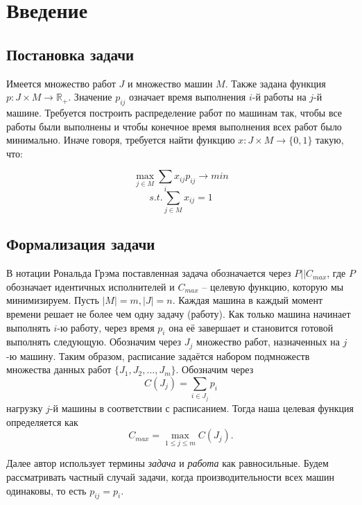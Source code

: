 \section{Введение}

\subsection{Постановка задачи}
Имеется множество работ $J$ и множество машин $M$. Также задана функция $p : J \times M \rightarrow \mathbb{R}_{+}$. Значение $p_{ij}$ означает время выполнения $i$-й работы на $j$-й машине. Требуется построить распределение работ по машинам так, чтобы все работы были выполнены и чтобы конечное время выполнения всех работ было минимально. Иначе говоря, требуется найти функцию $x : J \times M \rightarrow \{0, 1\}$ такую, что:

$$\max_{j \in M} \sum_{i} x_{ij}p_{ij} \rightarrow min$$
$$s.t. \sum_{j \in M} x_{ij} = 1$$

\subsection{Формализация задачи}
В нотации Рональда Грэма поставленная задача обозначается через $P||C_{max}$, где $P$ обозначает идентичных исполнителей и $C_{max}$ -- целевую функцию, которую мы минимизируем. Пусть $|M| = m, |J| = n$. Каждая машина в каждый момент времени решает не более чем одну задачу (работу). Как только машина начинает выполнять $i$-ю работу, через время $p_{i}$ она её завершает и становится готовой выполнять следующую. Обозначим через $J_{j}$ множество работ, назначенных на $j$-ю машину. Таким образом, расписание задаётся набором подмножеств множества данных работ $\{J_{1}, J_{2},\ldots, J_{m}\}$. Обозначим через $$C(J_{j}) = \sum_{i \in J_{j}} p_{i}$$ нагрузку $j$-й машины в соответствии с расписанием. Тогда наша целевая функция определяется как $$C_{max} = \max_{1 \leq j \leq m} C(J_{j}).$$

\noindent
Далее автор использует термины \textit{задача} и \textit{работа} как равносильные. Будем рассматривать частный случай задачи, когда производительности всех машин одинаковы, то есть $p_{ij} = p_{i}$.